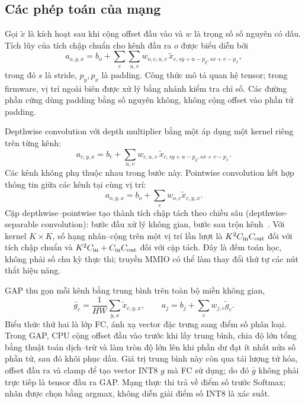 \subsection{Các phép toán của mạng}
Gọi $\widetilde{x}$ là kích hoạt sau khi cộng offset đầu vào và $w$ là trọng số số nguyên có dấu. Tích lũy của tích chập chuẩn cho kênh đầu ra $o$ được biểu diễn bởi
\begin{equation}
 a_{o,y,x}=b_o+\sum_c\sum_{u,v}w_{o,c,u,v}\,
 \widetilde{x}_{c,sy+u-p_y,sx+v-p_x},
\end{equation}
trong đó $s$ là stride, $p_y,p_x$ là padding. Công thức mô tả quan hệ tensor; trong firmware, vị trí ngoài biên được xử lý bằng nhánh kiểm tra chỉ số. Các đường phần cứng dùng padding bằng số nguyên không, không cộng offset vào phần tử padding.

Depthwise convolution với depth multiplier bằng một áp dụng một kernel riêng trên từng kênh:
\begin{equation}
 a_{c,y,x}=b_c+\sum_{u,v}w_{c,u,v}\,
 \widetilde{x}_{c,sy+u-p_y,sx+v-p_x}.
\end{equation}
Các kênh không phụ thuộc nhau trong bước này. Pointwise convolution kết hợp thông tin giữa các kênh tại cùng vị trí:
\begin{equation}
 a_{o,y,x}=b_o+\sum_c w_{o,c}\widetilde{x}_{c,y,x}.
\end{equation}
Cặp depthwise--pointwise tạo thành tích chập tách theo chiều sâu (depthwise-separable convolution): bước đầu xử lý không gian, bước sau trộn kênh~\cite[Section~3.1]{howard2017mobilenets}. Với kernel $K\times K$, số hạng nhân--cộng trên một vị trí lần lượt là $K^2C_{\rm in}C_{\rm out}$ đối với tích chập chuẩn và $K^2C_{\rm in}+C_{\rm in}C_{\rm out}$ đối với cặp tách. Đây là đếm toán học, không phải số chu kỳ thực thi; truyền MMIO có thể làm thay đổi thứ tự các nút thắt hiệu năng.

GAP thu gọn mỗi kênh bằng trung bình trên toàn bộ miền không gian,
\begin{equation}
 \bar{g}_c=\frac{1}{HW}\sum_{y,x}\widetilde{x}_{c,y,x},\qquad
 a_j=b_j+\sum_c w_{j,c}\widetilde{g}_c.
\end{equation}
Biểu thức thứ hai là lớp FC, ánh xạ vector đặc trưng sang điểm số phân loại. Trong GAP, CPU cộng offset đầu vào trước khi lấy trung bình, chia độ lớn tổng bằng thuật toán dịch--trừ và làm tròn độ lớn lên khi phần dư đạt ít nhất nửa số phần tử, sau đó khôi phục dấu. Giá trị trung bình này còn qua tái lượng tử hóa, offset đầu ra và clamp để tạo vector INT8 $g$ mà FC sử dụng; do đó $\bar{g}$ không phải trực tiếp là tensor đầu ra GAP. Mạng thực thi trả về điểm số trước Softmax; nhãn được chọn bằng argmax, không diễn giải điểm số INT8 là xác suất.

